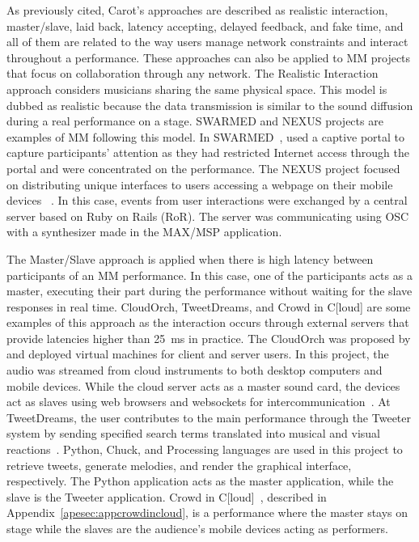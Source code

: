 As previously cited, Carot's approaches are described as realistic interaction, master/slave, laid back, latency accepting, delayed feedback, and fake time, and all of them are related to the way users manage network constraints and interact throughout a performance.
These approaches can also be applied to MM projects that focus on collaboration through any network.
The Realistic Interaction approach considers musicians sharing the same physical space.
This model is dubbed as realistic because the data transmission is similar to the sound diffusion during a real performance on a stage.
SWARMED and NEXUS projects are examples of MM following this model.
In SWARMED~\citep{Hindle2013swarmed},  used a captive portal to capture participants' attention as they had restricted Internet access through the portal and were concentrated on the performance.
The NEXUS project focused on distributing unique interfaces to users accessing a webpage on their mobile devices~
\citep{Allison2013nexus}.
In this case, events from user interactions were exchanged by a central server based on Ruby on Rails (RoR).
The server was communicating using OSC with a synthesizer made in the MAX/MSP application.

The Master/Slave approach is applied when there is high latency between participants of an MM performance.
In this case, one of the participants acts as a master, executing their part during the performance without waiting for the slave responses in real time.
CloudOrch, TweetDreams, and Crowd in C[loud] are some examples of this approach as the interaction occurs through external servers that provide latencies higher than 25~ms in practice.
The CloudOrch was proposed by  and deployed virtual machines for client and server users.
In this project, the audio was streamed from cloud instruments to both desktop computers and mobile devices.
While the cloud server acts as a master sound card, the devices act as slaves using web browsers and websockets for intercommunication~\citep{Hindle2014cloudorch}.
At TweetDreams, the user contributes to the main performance through the Tweeter system by sending specified search terms translated into musical and visual reactions~\citep{Dahl2011tweetdreams}.
Python, Chuck, and Processing languages are used in this project to retrieve tweets, generate melodies, and render the graphical interface, respectively.
The Python application acts as the master application, while the slave is the Tweeter application.
Crowd in C[loud]~\citep{Lee2016crowd,deCarvalhoJunior2016understanding}, described in Appendix~\ref{apesec:appcrowdincloud}, is a performance where the master stays on stage while the slaves are the audience's mobile devices acting as performers.

